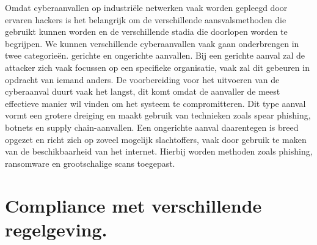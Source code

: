 Omdat cyberaanvallen op industriële netwerken vaak worden gepleegd door ervaren hackers is het belangrijk om de verschillende aansvalsmethoden die gebruikt kunnen worden en de verschillende stadia die doorlopen worden te begrijpen. We kunnen verschillende cyberaanvallen vaak gaan onderbrengen in twee categorieën. gerichte en ongerichte aanvallen. Bij een gerichte aanval zal de attacker zich vaak focussen op een specifieke organisatie, vaak zal dit gebeuren in opdracht van iemand anders. De voorbereiding voor het uitvoeren van de cyberaanval duurt vaak het langst, dit komt omdat de aanvaller de meest effectieve manier wil vinden om het systeem te compromitteren. Dit type aanval vormt een grotere dreiging en maakt gebruik van technieken zoals spear phishing, botnets en supply chain-aanvallen. Een ongerichte aanval daarentegen is breed opgezet en richt zich op zoveel mogelijk slachtoffers, vaak door gebruik te maken van de beschikbaarheid van het internet. Hierbij worden methoden zoals phishing, ransomware en grootschalige scans toegepast. \autocite{biju2019}



\section{Compliance met verschillende regelgeving.}
